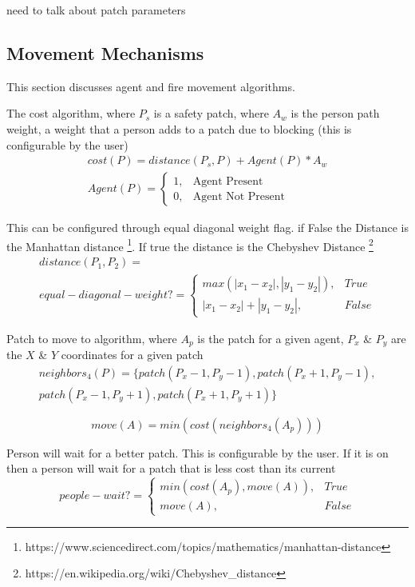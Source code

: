 \documentclass[12pt,letterpaper]{article}
\begin{document}
need to talk about patch parameters
\subsection{Movement Mechanisms}
This section discusses agent and fire movement algorithms.

The cost algorithm, where $P_s$ is a safety patch, where $A_w$ is the person path weight, a weight that a person adds to a patch due to blocking (this is configurable by the user)
\begin{align}
cost(P)  = distance(P_s, P) + Agent(P) * A_w \nonumber \\
Agent(P)=
\begin{cases}
1, & \text{Agent Present}  \\
0, & \text{Agent Not Present} 
\end{cases}
\end{align}

This can be configured through equal diagonal weight flag. if False the Distance is the Manhattan distance \footnote{ https://www.sciencedirect.com/topics/mathematics/manhattan-distance}. If true the distance is the Chebyshev Distance \footnote{https://en.wikipedia.org/wiki/Chebyshev\_distance}
\begin{align}
distance(P_1, P_2)  = \nonumber\\
equal-diagonal-weight?=
\begin{cases}
	max(|x_1-x_2|, |y_1-y_2|), & True \\
	|x_1-x_2|+ |y_1-y_2|, & False
\end{cases}
\end{align}


Patch to move to algorithm, where $A_p$ is the patch for a given agent, $P_x$ \& $P_y$ are the $X$ \& $Y$ coordinates for a given patch
\begin{align}
neighbors_4 (P)  = \{patch(P_x - 1, P_y -1), patch(P_x + 1, P_y -1), \nonumber \\ 
patch(P_x - 1, P_y + 1),patch(P_x + 1, P_y + 1)\}   
\end{align}

\begin{equation}
move(A) = min(cost(neighbors_4 (A_p)))
\end{equation}

Person will wait for a better patch.  This is configurable by the user. If it is on then a person will wait for a patch that is less cost than its current
\begin{equation}
people-wait?=
\begin{cases}
min(cost(A_p), move(A)), & True\\
move(A), & False
\end{cases}
\end{equation}
\end{document}
